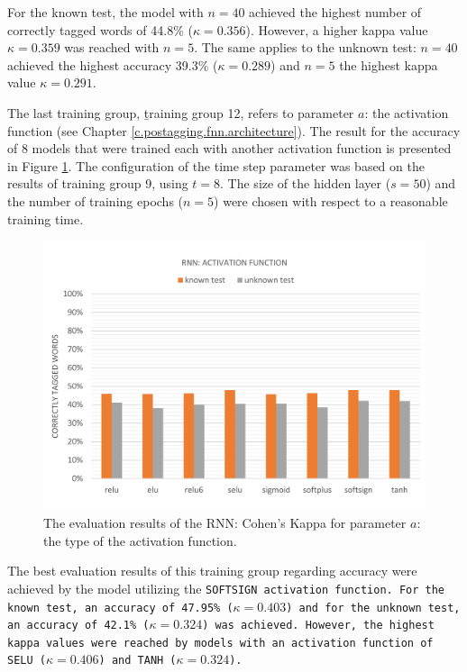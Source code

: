 For the known test, the model with $n=40$ achieved the highest number of correctly tagged words of 44.8\% ($\kappa=0.356$). However, a higher kappa value $\kappa=0.359$ was reached with $n=5$. The same applies to the unknown test: $n=40$ achieved the highest accuracy 39.3\% ($\kappa=0.289$) and $n=5$ the highest kappa value $\kappa=0.291$.

The last training group, \b{training group 12}, refers to parameter $a$: the activation function (see Chapter \ref{c.postagging.fnn.architecture}). The result for the accuracy of 8 models that were trained each with another activation function is presented in Figure \ref{f.evaluation.rnn.a}. The configuration of the time step parameter was based on the results of training group 9, using $t=8$. The size of the hidden layer ($s=50$) and the number of training epochs ($n=5$) were chosen with respect to a reasonable training time.

\begin{figure}[H]
	\hspace{-5mm}\includegraphics[width=1.07\textwidth]{images/evaluation_rnn_a}
	\caption[RNN Evaluation: Activation Function]{The evaluation results of the RNN: Cohen's Kappa for parameter $a$: the type of the activation function.}
	\label{f.evaluation.rnn.a}
\end{figure}

The best evaluation results of this training group regarding accuracy were achieved by the model utilizing the \tt{SOFTSIGN} activation function. For the known test, an accuracy of 47.95\% ($\kappa=0.403$) and for the unknown test, an accuracy of 42.1\% ($\kappa=0.324$) was achieved. However, the highest kappa values were reached by models with an activation function of \tt{SELU} ($\kappa=0.406$) and \tt{TANH} ($\kappa=0.324$).

